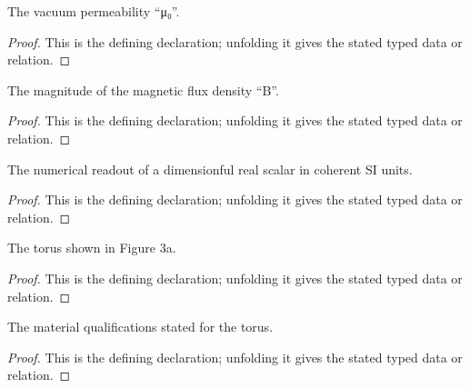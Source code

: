 \begin{definition}[VacuumPermeabilityMagnitude]
  \label{decl:physics:IPhO_2026_3_A_1:VacuumPermeabilityMagnitude}
  The vacuum permeability “μ₀”.
\end{definition}
\begin{proof}
  This is the defining declaration; unfolding it gives the stated typed data or relation.
\end{proof}

\begin{definition}[MagneticFluxDensityMagnitude]
  \label{decl:physics:IPhO_2026_3_A_1:MagneticFluxDensityMagnitude}
  The magnitude of the magnetic flux density “B”.
\end{definition}
\begin{proof}
  This is the defining declaration; unfolding it gives the stated typed data or relation.
\end{proof}

\begin{definition}[siReadout]
  \label{decl:physics:IPhO_2026_3_A_1:siReadout}
  The numerical readout of a dimensionful real scalar in coherent SI units.
\end{definition}
\begin{proof}
  This is the defining declaration; unfolding it gives the stated typed data or relation.
\end{proof}

\begin{definition}[ParamagneticTorus]
  \label{decl:physics:IPhO_2026_3_A_1:ParamagneticTorus}
  The torus shown in Figure 3a.
\end{definition}
\begin{proof}
  This is the defining declaration; unfolding it gives the stated typed data or relation.
\end{proof}

\begin{definition}[HasStatedMaterialProperties]
  \label{decl:physics:IPhO_2026_3_A_1:HasStatedMaterialProperties}
  The material qualifications stated for the torus.
\end{definition}
\begin{proof}
  This is the defining declaration; unfolding it gives the stated typed data or relation.
\end{proof}


